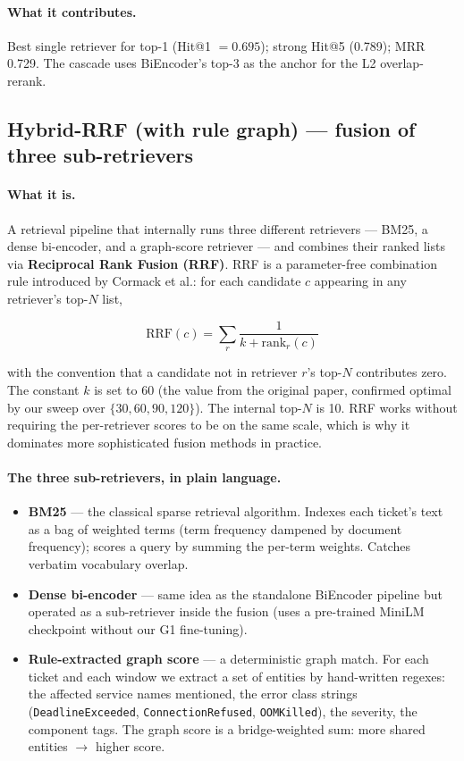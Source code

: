 \paragraph{What it contributes.} Best single retriever for top-1 (Hit@1 $= 0.695$); strong Hit@5 (0.789); MRR 0.729. The cascade uses BiEncoder's top-3 as the anchor for the L2 overlap-rerank.

\subsection{Hybrid-RRF (with rule graph) --- fusion of three sub-retrievers}

\paragraph{What it is.} A retrieval pipeline that internally runs three different retrievers --- BM25, a dense bi-encoder, and a graph-score retriever --- and combines their ranked lists via \textbf{Reciprocal Rank Fusion (RRF)}. RRF is a parameter-free combination rule introduced by Cormack et al.: for each candidate $c$ appearing in any retriever's top-$N$ list,

\[
\text{RRF}(c) = \sum_r \frac{1}{k + \text{rank}_r(c)}
\]

with the convention that a candidate not in retriever $r$'s top-$N$ contributes zero. The constant $k$ is set to 60 (the value from the original paper, confirmed optimal by our sweep over $\{30, 60, 90, 120\}$). The internal top-$N$ is 10. RRF works without requiring the per-retriever scores to be on the same scale, which is why it dominates more sophisticated fusion methods in practice.

\paragraph{The three sub-retrievers, in plain language.}

\begin{itemize}
\item \textbf{BM25} --- the classical sparse retrieval algorithm. Indexes each ticket's text as a bag of weighted terms (term frequency dampened by document frequency); scores a query by summing the per-term weights. Catches verbatim vocabulary overlap.
\item \textbf{Dense bi-encoder} --- same idea as the standalone BiEncoder pipeline but operated as a sub-retriever inside the fusion (uses a pre-trained MiniLM checkpoint without our G1 fine-tuning).
\item \textbf{Rule-extracted graph score} --- a deterministic graph match. For each ticket and each window we extract a set of entities by hand-written regexes: the affected service names mentioned, the error class strings (\texttt{DeadlineExceeded}, \texttt{ConnectionRefused}, \texttt{OOMKilled}), the severity, the component tags. The graph score is a bridge-weighted sum: more shared entities $\rightarrow$ higher score.
\end{itemize}


